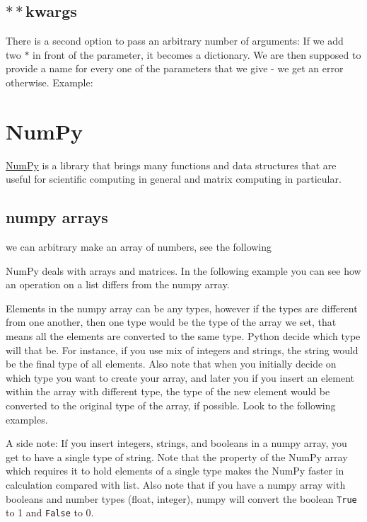 \documentclass[10pt,a4paper]{article}
\begin{document}
\subsection{$\ast\ast$kwargs}
There is a second option to pass an arbitrary number of arguments: If we add two $\ast$ in front of the parameter, it becomes a dictionary. We are then supposed to provide a name for every one of the parameters that we give - we get an error otherwise. Example:











\section{NumPy}
\href{https://numpy.org}{NumPy} is a library that brings many functions and data structures that are useful for scientific computing in general and matrix computing in particular. 

\subsection{numpy arrays}
we can arbitrary make an array of numbers, see the following

\label{subsec:numpy_arrays}
NumPy deals with arrays and matrices. In the following example you can see how an operation on a list differs from the numpy array.

Elements in the numpy array can be any types, however if the types are different from one another, then one type would be the type of the array we set, that means all the elements are converted to the same type. Python  decide which type will that be. For instance, if you use mix of integers and strings, the string would be the final type of all elements. Also note that when you initially decide on which type you want to create your array, and later you if you insert  an element within the array with different type, the type of the new element would be converted to the  original type of the array, if possible. Look to the following examples.

A side note: If you insert integers, strings, and booleans in a numpy array, you get to have a single type of string.
Note that the property of the NumPy array which requires it to hold elements of a single type makes the NumPy faster in calculation compared with list. Also note that if you have a numpy array with booleans and number types (float, integer), numpy will convert the boolean \texttt{True} to 1 and \texttt{False} to 0.
\end{document}
